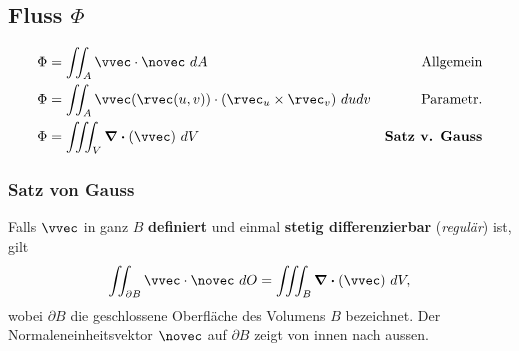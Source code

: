 \subsection{Fluss \texorpdfstring{\hfill $\Phi$}{Phi}}
    \vspace{-1em}
    \begin{align*}
        \Phi &= \iint_A \vvec \cdot \novec \ dA &\textrm{Allgemein}\\
        \Phi &= \iint_A \vvec(\rvec(u,v)) \cdot (\rvec_u \times \rvec_v) \ du dv &\textrm{Parametr.}\\
        \Phi &= \iiint_V \div(\vvec) \ dV &\textbf{Satz\ v. Gauss}
    \end{align*}

    \subsubsection{Satz von Gauss}
        Falls $\vvec$ in ganz $B$ \textbf{definiert} und einmal \textbf{stetig differenzierbar} (\textit{regulär}) ist, gilt
        $$
            \iint_{\partial B} \vvec \cdot \novec \ dO = \iiint_B \div(\vvec) \ dV,
        $$
        wobei $\partial B$ die geschlossene Oberfläche des Volumens $B$ bezeichnet.
        Der Normaleneinheitsvektor $\novec$ auf $\partial B$ zeigt von innen nach aussen.